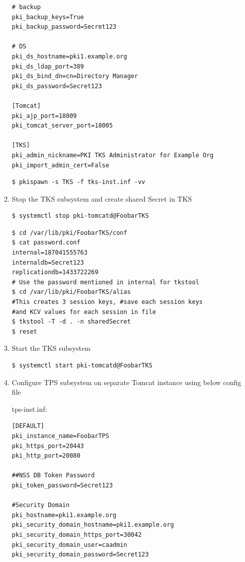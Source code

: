 \documentclass[12pt]{report}
\begin{document}
\begin{enumerate}[label*=\arabic*.]
\begin{enumerate}[label*=\arabic*.]
\begin{lstlisting}[style=configFile]
# backup
pki_backup_keys=True
pki_backup_password=Secret123

# DS
pki_ds_hostname=pki1.example.org
pki_ds_ldap_port=389
pki_ds_bind_dn=cn=Directory Manager
pki_ds_password=Secret123

[Tomcat]
pki_ajp_port=18009
pki_tomcat_server_port=18005

[TKS]
pki_admin_nickname=PKI TKS Administrator for Example Org
pki_import_admin_cert=False
            \end{lstlisting}
            \begin{lstlisting}[style=bashInputStyle]
$ pkispawn -s TKS -f tks-inst.inf -vv
            \end{lstlisting}
            \item Stop the TKS subsystem and create shared Secret in TKS
                \begin{lstlisting}[style=bashInputStyle]
$ systemctl stop pki-tomcatd@FoobarTKS                
                \end{lstlisting}
                \begin{lstlisting}[style=bashInputStyle]
$ cd /var/lib/pki/FoobarTKS/conf
$ cat password.conf
internal=187041555763
internaldb=Secret123
replicationdb=1433722269
# Use the password mentioned in internal for tkstool
$ cd /var/lib/pki/FoobarTKS/alias
#This creates 3 session keys, #save each session keys
#and KCV values for each session in file
$ tkstool -T -d . -n sharedSecret
$ reset
                \end{lstlisting}
            \item Start the TKS subsystem 
            \begin{lstlisting}[style=bashInputStyle]                
$ systemctl start pki-tomcatd@FoobarTKS            
            \end{lstlisting}
            \item Configure TPS subsystem on separate Tomcat instance using below config file

            tps-inst.inf:
            \begin{lstlisting}[style=configFile]
[DEFAULT]
pki_instance_name=FoobarTPS
pki_https_port=20443
pki_http_port=20080

##NSS DB Token Password
pki_token_password=Secret123

#Security Domain
pki_hostname=pki1.example.org
pki_security_domain_hostname=pki1.example.org
pki_security_domain_https_port=30042
pki_security_domain_user=caadmin
pki_security_domain_password=Secret123


\end{lstlisting}
\end{enumerate}
\end{enumerate}
\end{document}
